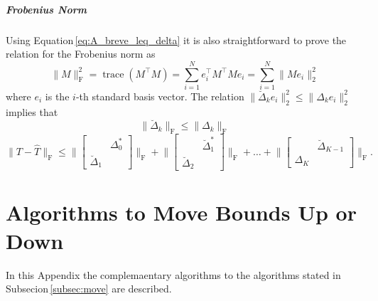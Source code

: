 \documentclass[numbers=noenddot,doctype=mastersthesis,BCOR=15mm,biblatex]{ldvbook}%
\DeclareMathOperator{\trace}{trace}
\begin{document}
\paragraph{Frobenius Norm}
Using Equation\,\ref{eq:A_breve_leq_delta} it is also straightforward to prove the relation for the Frobenius norm
as 
\begin{equation}
	\|M\|_\text{F}^2 = \trace(M^\top M) = \sum_{i=1}^{N} e_i^\top M^\top M e_i = \sum_{i=1}^{N} \|M e_i\|_2^2
\end{equation}
where $e_i$ is the $i$-th standard basis vector.
The relation $\|\breve{\Delta}_k e_i\|_2^2 \leq \|\Delta_k e_i\|_2^2$ implies that 
\begin{equation}
	\|\breve{\Delta}_k\|_\text{F} \leq \|\Delta_k\|_\text{F}
\end{equation}
\begin{equation}
\|T-\hat{T}\|_\text{F} \leq
\Bigg\|
\begin{bmatrix}
&\Delta_0^*\\
\breve{\Delta}_1
\end{bmatrix}
\Bigg\|_\text{F}+\Bigg\|
\begin{bmatrix}
&\breve{\Delta}_1^*\\
\breve{\Delta}_2
\end{bmatrix}
\Bigg\|_\text{F}+\dots+\Bigg\|
\begin{bmatrix}
&\breve{\Delta}_{K-1}\\
\Delta_K
\end{bmatrix}
\Bigg\|_\text{F}.
\end{equation}

\chapter{Algorithms to Move Bounds Up or Down}\label{A:move}
In this Appendix the complemaentary algorithms to the algorithms stated in Subsecion\,\ref{subsec:move} are described.
\end{document}
